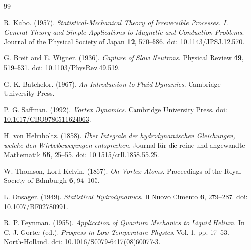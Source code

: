     \begin{thebibliography}{99}
        
        R. Kubo. (1957).
        \textit{Statistical-Mechanical Theory of Irreversible Processes. I. General Theory and Simple Applications to Magnetic and Conduction Problems}.
        Journal of the Physical Society of Japan \textbf{12}, 570--586.
        doi: \href{https://doi.org/10.1143/JPSJ.12.570}{10.1143/JPSJ.12.570}.
        
        G. Breit and E. Wigner. (1936).
        \textit{Capture of Slow Neutrons}.
        Physical Review \textbf{49}, 519--531.
        doi: \href{https://doi.org/10.1103/PhysRev.49.519}{10.1103/PhysRev.49.519}.
        
        G. K. Batchelor. (1967).
        \textit{An Introduction to Fluid Dynamics}.
        Cambridge University Press.
        
        P. G. Saffman. (1992).
        \textit{Vortex Dynamics}.
        Cambridge University Press.
        doi: \href{https://doi.org/10.1017/CBO9780511624063}{10.1017/CBO9780511624063}.
        
        H. von Helmholtz. (1858).
        \textit{\"Uber Integrale der hydrodynamischen Gleichungen, welche den Wirbelbewegungen entsprechen}.
        Journal f\"ur die reine und angewandte Mathematik \textbf{55}, 25--55.
        doi: \href{https://doi.org/10.1515/crll.1858.55.25}{10.1515/crll.1858.55.25}.
        
        W. Thomson, Lord Kelvin. (1867).
        \textit{On Vortex Atoms}.
        Proceedings of the Royal Society of Edinburgh \textbf{6}, 94--105.
        
        L. Onsager. (1949).
        \textit{Statistical Hydrodynamics}.
        Il Nuovo Cimento \textbf{6}, 279--287.
        doi: \href{https://doi.org/10.1007/BF02780991}{10.1007/BF02780991}.
        
        R. P. Feynman. (1955).
        \textit{Application of Quantum Mechanics to Liquid Helium}.
        In C. J. Gorter (ed.), \textit{Progress in Low Temperature Physics}, Vol. 1, pp. 17--53.
        North-Holland.
        doi: \href{https://doi.org/10.1016/S0079-6417(08)60077-3}{10.1016/S0079-6417(08)60077-3}.
        

\end{thebibliography}
